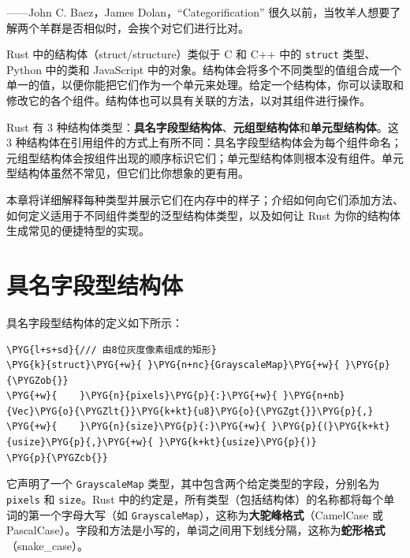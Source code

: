 
\begin{myEpigraph}{——John C. Baez，James Dolan，“Categorification”}
很久以前，当牧羊人想要了解两个羊群是否相似时，会挨个对它们进行比对。
\end{myEpigraph}

Rust 中的结构体（struct/\allowbreak{}structure）类似于 C 和 C++ 中的 \texttt{struct} 类型、Python 中的类和 JavaScript 中的对象。结构体会将多个不同类型的值组合成一个单一的值，以便你能把它们作为一个单元来处理。给定一个结构体，你可以读取和修改它的各个组件。结构体也可以具有关联的方法，以对其组件进行操作。

Rust 有 3 种结构体类型：\textbf{具名字段型结构体}、\textbf{元组型结构体}和\textbf{单元型结构体}。这 3 种结构体在引用组件的方式上有所不同：具名字段型结构体会为每个组件命名；元组型结构体会按组件出现的顺序标识它们；单元型结构体则根本没有组件。单元型结构体虽然不常见，但它们比你想象的更有用。

本章将详细解释每种类型并展示它们在内存中的样子；介绍如何向它们添加方法、如何定义适用于不同组件类型的泛型结构体类型，以及如何让 Rust 为你的结构体生成常见的便捷特型的实现。

\section{具名字段型结构体}

具名字段型结构体的定义如下所示：

\begin{Verbatim}[commandchars=\\\{\},breaklines=true,breakanywhere=true,fontsize=\codefont,xleftmargin=17bp]
\PYG{l+s+sd}{/// 由8位灰度像素组成的矩形}
\PYG{k}{struct}\PYG{+w}{ }\PYG{n+nc}{GrayscaleMap}\PYG{+w}{ }\PYG{p}{\PYGZob{}}
\PYG{+w}{    }\PYG{n}{pixels}\PYG{p}{:}\PYG{+w}{ }\PYG{n+nb}{Vec}\PYG{o}{\PYGZlt{}}\PYG{k+kt}{u8}\PYG{o}{\PYGZgt{}}\PYG{p}{,}
\PYG{+w}{    }\PYG{n}{size}\PYG{p}{:}\PYG{+w}{ }\PYG{p}{(}\PYG{k+kt}{usize}\PYG{p}{,}\PYG{+w}{ }\PYG{k+kt}{usize}\PYG{p}{)}
\PYG{p}{\PYGZcb{}}
\end{Verbatim}

它声明了一个 \texttt{GrayscaleMap} 类型，其中包含两个给定类型的字段，分别名为 \texttt{pixels} 和 \texttt{size}。Rust 中的约定是，所有类型（包括结构体）的名称都将每个单词的第一个字母大写（如 \texttt{GrayscaleMap}），这称为\textbf{大驼峰格式}（CamelCase 或 PascalCase）。字段和方法是小写的，单词之间用下划线分隔，这称为\textbf{蛇形格式}（snake\_case）。

